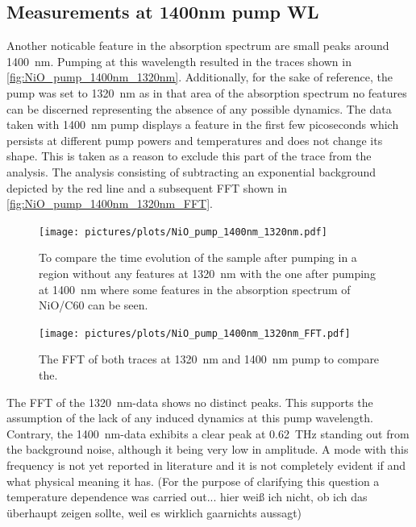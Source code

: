 \subsection{Measurements at 1400nm pump WL}
Another noticable feature in the absorption spectrum are small peaks around \qty{1400}{nm}.
Pumping at this wavelength resulted in the traces shown in \autoref{fig:NiO_pump_1400nm_1320nm}.
Additionally, for the sake of reference, the pump was set to \qty{1320}{nm} as in that area of the absorption spectrum no features can be discerned representing the absence of any possible dynamics.
The data taken with \qty{1400}{nm} pump displays a feature in the first few picoseconds which persists at different pump powers and temperatures and does not change its shape.
This is taken as a reason to exclude this part of the trace from the analysis.
The analysis consisting of subtracting an exponential background depicted by the red line and a subsequent FFT shown in \autoref{fig:NiO_pump_1400nm_1320nm_FFT}.
\begin{figure}[ht]
    \centering
    \texttt{[image: pictures/plots/NiO\_pump\_1400nm\_1320nm.pdf]} \vspace{-0.3cm}
    \caption{To compare the time evolution of the sample after pumping in a region without any features at \qty{1320}{nm} with the one after pumping at \qty{1400}{nm} where some features in the absorption spectrum of NiO/C60 can be seen.}
    \label{fig:NiO_pump_1400nm_1320nm}
\end{figure}
\begin{figure}[ht]
    \centering
    \texttt{[image: pictures/plots/NiO\_pump\_1400nm\_1320nm\_FFT.pdf]} \vspace{-0.3cm}
    \caption{The FFT of both traces at \qty{1320}{nm} and \qty{1400}{nm} pump to compare the.}
    \label{fig:NiO_pump_1400nm_1320nm_FFT}
\end{figure}
\FloatBarrier
The FFT of the \qty{1320}{nm}-data shows no distinct peaks.
This supports the assumption of the lack of any induced dynamics at this pump wavelength.
Contrary, the \qty{1400}{nm}-data exhibits a clear peak at \qty{0.62}{THz} standing out from the background noise, although it being very low in amplitude.
A mode with this frequency is not yet reported in literature and it is not completely evident if and what physical meaning it has.
(For the purpose of clarifying this question a temperature dependence was carried out... hier weiß ich nicht, ob ich das überhaupt zeigen sollte, weil es wirklich gaarnichts aussagt)

